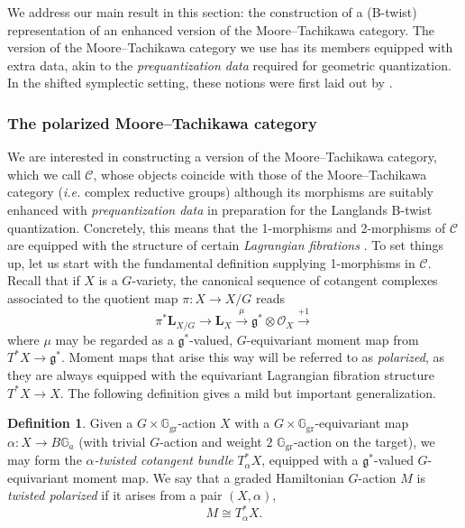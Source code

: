 \documentclass[11pt, a4paper]{amsart}
\numberwithin{equation}{section}
\theoremstyle{definition}
\newtheorem{definition}[theorem]{Definition}
\theoremstyle{remark}
\newcommand{\Cc}{\mathcal{C}}
\newcommand{\Ggr}{\mathbb{G}_{\mathrm{gr}}}
\newcommand{\GG}{\mathbb{G}}
\renewcommand{\to}{\longrightarrow}
\begin{document}
We address our main result in this section: the construction of a (B-twist) representation of an enhanced version of the Moore--Tachikawa category. The version of the Moore--Tachikawa category we use has its members equipped with extra data, akin to the \textit{prequantization data} required for geometric quantization. In the shifted symplectic setting, these notions were first laid out by \cite{Safronov}.  




\subsubsection{The polarized Moore--Tachikawa category}
\label{sc polarized MT}

We are interested in constructing a version of the Moore--Tachikawa category, which we call $\Cc$, whose objects coincide with those of the Moore--Tachikawa category ({\it i.e.} complex reductive groups) although its morphisms are suitably enhanced with \textit{prequantization data} in preparation for the Langlands B-twist quantization. Concretely, this means that the 1-morphisms and 2-morphisms of $\Cc$ are equipped with the structure of certain \textit{Lagrangian fibrations} \cite{Safronov}. To set things up, let us start with the fundamental definition supplying 1-morphisms in $\Cc$. Recall that if $X$ is a $G$-variety, the canonical sequence of cotangent complexes associated to the quotient map $\pi: X \to X/G$ reads
\begin{equation}
    \pi^*\mathbf{L}_{X/G} \to \mathbf{L}_X \overset{\mu}{\to} \mathfrak{g}^* \otimes \mathcal{O}_X \overset{+1}{\to}
\end{equation}
where $\mu$ may be regarded as a $\mathfrak{g}^*$-valued, $G$-equivariant moment map from $T^*X \to \mathfrak{g}^*$. Moment maps that arise this way will be referred to as \textit{polarized}, as they are always equipped with the equivariant Lagrangian fibration structure $T^*X \to X$. The following definition gives a mild but important generalization. 

\begin{definition}
Given a $G \times \Ggr$-action $X$ with a $G \times \Ggr$-equivariant map $\alpha: X \to B\GG_a$ (with trivial $G$-action and weight $2$ $\Ggr$-action on the target), we may form the \textit{$\alpha$-twisted cotangent bundle} $T^*_\alpha X$, equipped with a $\mathfrak{g}^*$-valued $G$-equivariant moment map. We say that a graded Hamiltonian $G$-action $M$ is \textit{twisted polarized} if it arises from a pair $(X,\alpha)$, 
\[
M \cong T^*_{\alpha}X.
\]
\end{definition}
\end{document}
